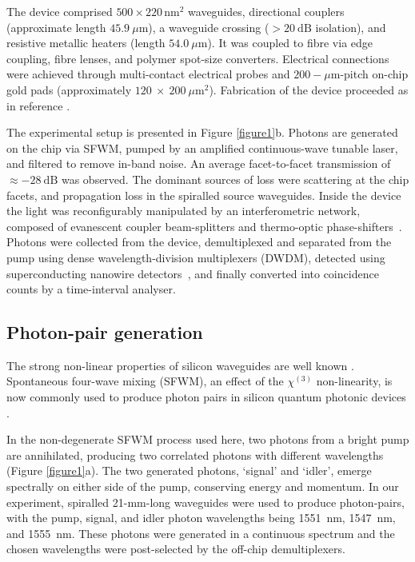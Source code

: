 \documentclass[
twocolumn,
 amsmath,amssymb,
 aps,
  twoside,
 superscriptaddress,
pra,
longbibliography
]{revtex4-1}
\begin{document}
The device comprised $500\times220\,\mathrm{nm}^2$ waveguides, directional couplers (approximate length  $45.9~\mu\textrm{m}$), a waveguide crossing ($> 20\ \mathrm{dB}$ isolation), and resistive metallic heaters (length $54.0~\mu\textrm{m}$). It was coupled to fibre via edge coupling, fibre lenses, and polymer spot-size converters. Electrical connections were achieved through multi-contact electrical probes and $200-\mu\textrm{m}$-pitch on-chip gold pads (approximately $120~\times~200~\mu\textrm{m}^2$). Fabrication of the device proceeded as in reference \cite{Silverstone2015}.
    
The experimental setup is presented in Figure \ref{figure1}b. Photons are generated on the chip via SFWM, pumped by an amplified continuous-wave tunable laser, and filtered to remove in-band noise. An average facet-to-facet transmission of $\approx -28\ \mathrm{dB}$ was observed. The dominant sources of loss were scattering at the chip facets, and propagation loss in the spiralled source waveguides. Inside the device the light was reconfigurably manipulated by an interferometric network, composed of evanescent coupler beam-splitters and thermo-optic phase-shifters~\cite{Trinh:1995gm, Harris:2014kz}. Photons were collected from the device, demultiplexed and separated from the pump using dense wavelength-division multiplexers (DWDM), detected using superconducting nanowire detectors~\cite{Miki:2013cv}, and finally converted into coincidence counts by a time-interval analyser.




\subsection{Photon-pair generation}

The strong non-linear properties of silicon waveguides are well known \cite{Leuthold:2010dg}. Spontaneous four-wave mixing (SFWM), an effect of the $\chi^{(3)}$  non-linearity, is now commonly used to produce photon pairs in silicon quantum photonic devices \cite{Sharping2006, Silverstone:2013fu}.

In the non-degenerate SFWM process used here, two photons from a bright pump are annihilated, producing two correlated photons with different wavelengths (Figure \ref{figure1}a). The two generated photons, `signal' and `idler', emerge spectrally on either side of the pump, conserving energy and momentum. In our experiment, spiralled 21-mm-long waveguides were used to produce photon-pairs, with the pump, signal, and idler photon wavelengths being 1551~nm, 1547~nm, and 1555~nm. These photons were generated in a continuous spectrum and the chosen wavelengths were post-selected by the off-chip demultiplexers.
\end{document}
